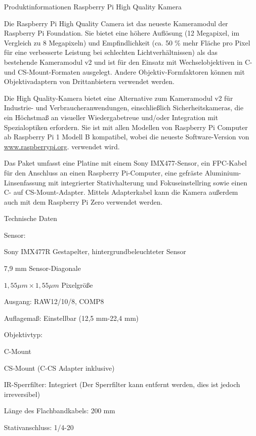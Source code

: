 \bigskip

Produktinformationen \glqq Raspberry Pi High Quality Kamera\grqq 

Die Raspberry Pi High Quality Camera ist das neueste Kameramodul der Raspberry Pi Foundation. Sie bietet eine höhere Auflösung (12 Megapixel, im Vergleich zu 8 Megapixeln) und Empfindlichkeit (ca. 50 \% mehr Fläche pro Pixel für eine verbesserte Leistung bei schlechten Lichtverhältnissen) als das bestehende Kameramodul v2 und ist für den Einsatz mit Wechselobjektiven in C- und CS-Mount-Formaten ausgelegt. Andere Objektiv-Formfaktoren können mit Objektivadaptern von Drittanbietern verwendet werden.

Die High Quality-Kamera bietet eine Alternative zum Kameramodul v2 für Industrie- und Verbraucheranwendungen, einschließlich Sicherheitskameras, die ein Höchstmaß an visueller Wiedergabetreue und/oder Integration mit Spezialoptiken erfordern. Sie ist mit allen Modellen von Raspberry Pi Computer ab Raspberry Pi 1 Modell B kompatibel, wobei die neueste Software-Version von \url{www.raspberrypi.org}. verwendet wird.



Das Paket umfasst eine Platine mit einem Sony IMX477-Sensor, ein FPC-Kabel für den Anschluss an einen Raspberry Pi-Computer, eine gefräste Aluminium-Linsenfassung mit integrierter Stativhalterung und Fokuseinstellring sowie einen C- auf CS-Mount-Adapter. Mittels Adapterkabel kann die Kamera außerdem auch mit dem Raspberry Pi Zero verwendet werden.

\bigskip


Technische Daten

Sensor: 

Sony IMX477R Gestapelter, hintergrundbeleuchteter Sensor 

7,9 mm Sensor-Diagonale

$1,55 \mu m \times 1,55 \mu m$ Pixelgröße

Ausgang: RAW12/10/8, COMP8

Auflagemaß: Einstellbar (12,5 mm-22,4 mm)

\bigskip

Objektivtyp:

C-Mount

CS-Mount (C-CS Adapter inklusive)

IR-Sperrfilter: Integriert (Der Sperrfilter kann entfernt werden, dies ist jedoch irreversibel) 

Länge des Flachbandkabels: 200 mm

Stativanschluss: 1/4\grqq{}-20

